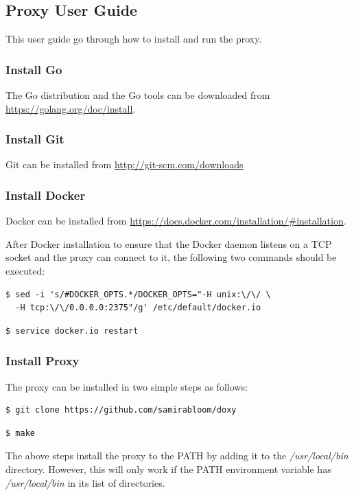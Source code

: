 \documentclass[a4paper,11pt,twoside]{report}
\begin{document}
\begin{appendices}
\chapter[ Proxy User Guide]{\huge Proxy User Guide}\label{Appendix-V}
This user guide go through how to install and run the proxy.
\subsection*{Install Go}
The Go distribution and the Go tools can be downloaded from \url{https://golang.org/doc/install}.

\subsection*{Install Git}
Git can be installed from \url{http://git-scm.com/downloads}

\subsection*{Install Docker}
Docker can be installed from \url{https://docs.docker.com/installation/#installation}. 

\noindent
After Docker installation to ensure that the Docker daemon listens on a TCP socket and the proxy can connect to it, the following two commands should be executed: \medskip

\begin{lstlisting}[language=terminal]
$ sed -i 's/#DOCKER_OPTS.*/DOCKER_OPTS="-H unix:\/\/ \ 
  -H tcp:\/\/0.0.0.0:2375"/g' /etc/default/docker.io
\end{lstlisting}

\begin{lstlisting}[language=terminal]
$ service docker.io restart  
\end{lstlisting}

\subsection*{Install Proxy}
The proxy can be installed in two simple steps as follows:
\begin{lstlisting}[language=terminal]
$ git clone https://github.com/samirabloom/doxy
\end{lstlisting}

\begin{lstlisting}[language=terminal]
$ make
\end{lstlisting}

\noindent
The above steps install the proxy to the PATH by adding it to the \textit{/usr/local/bin} directory. However, this will only work if the PATH environment variable has \textit{/usr/local/bin} in its list of directories. 


\end{appendices}
\end{document}

